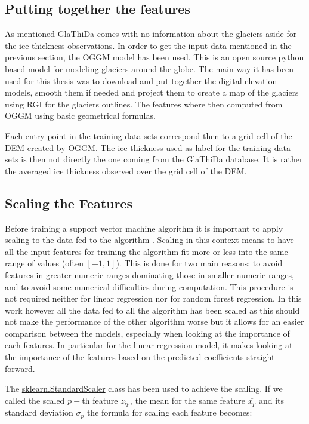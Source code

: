 \subsection{Putting together the features}
As mentioned GlaThiDa comes with no information about the glaciers aside for the ice thickness observations. In order to get the input data mentioned in the previous section, the OGGM model has been used. This is an open source python based model for modeling glaciers around the globe. The main way it has been used for this thesis was to download and put together the digital elevation models, smooth them if needed and project them to create a map of the glaciers using RGI for the glaciers outlines. The features where then computed from OGGM using basic geometrical formulas. 

Each entry point in the training data-sets correspond then to a grid cell of the DEM created by OGGM. The ice thickness used as label for the training data-sets is then not directly the one coming from the GlaThiDa database. It is rather the averaged ice thickness observed over the grid cell of the DEM.

\subsection{Scaling the Features}
Before training a support vector machine algorithm it is important to apply scaling to the data fed to the algorithm \citet{ScalingSVM2003}. Scaling in this context means to have all the input features for training the algorithm fit more or less into the same range of values (often $[-1,1]$). This is done for two main reasons: to avoid features in greater numeric ranges dominating those in smaller numeric ranges, and to avoid some numerical difficulties during computation. This procedure is not required neither for linear regression nor for random forest regression. In this work however all the data fed to all the algorithm has been scaled as this should not make the performance of the other algorithm worse but it allows for an easier comparison between the models, especially when looking at the importance of each features. In particular for the linear regression model, it makes looking at the importance of the features based on the predicted coefficients straight forward.

The \href{https://scikit-learn.org/stable/modules/generated/sklearn.preprocessing.StandardScaler.html}{sklearn.StandardScaler} class has been used to achieve the scaling. If we called the scaled $p-$th feature $z_{ip}$, the mean for the same feature $\overline{x_p}$ and its standard deviation $\sigma_p$ the formula for scaling each feature becomes:


